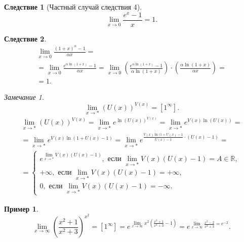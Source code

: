 \documentclass[a4paper,12pt]{article} %
\newtheorem{corollary}{Следствие}[theorem]
\theoremstyle{remark}
\newtheorem{remark}{Замечание}[theorem]
\theoremstyle{definition}
\newtheorem{exmp}{Пример}[section]
\begin{document}
\begin{corollary}[Частный случай следствия 4]
	\[
	\lim_{x \to 0} \frac{e^{x}-1}{x} = 1
	.\] 
\end{corollary}
\begin{corollary}
	\begin{multline}
		\lim_{x \to 0} \frac{(1+x)^{\alpha} - 1}{\alpha x} = \\
		= \lim_{x \to 0} \frac{e^{\alpha \ln(1+x)} - 1}{\alpha x} = \lim_{x \to 0} \left(\frac{e^{\alpha \ln(1+x)} - 1}{\alpha \ln(1+x)}\right) \cdot \left(\frac{\alpha \ln(1+x)}{\alpha x}\right) = \\
		= 1.
	\end{multline}
\end{corollary}
\begin{remark}
	\[
		\lim_{x \to *} (U(x))^{V(x)} = [1^{\infty}]
	.\] 	
	\begin{multline}
		\lim_{x \to *} (U(x))^{V(x)} = \lim_{x \to *}  e^{\ln(U(x))^{V(x)}} = \lim_{x \to *} e^{V(x)\ln(U(x))} = \\
		= \lim_{x \to *} e^{V(x)\ln(1 + U(x) - 1)} = \lim_{x \to *} e^{\frac{V(x)\ln(1 + U(x) - 1}{U(x) - 1}\cdot (U(x) - 1)} = \\
		= \begin{cases}
			e^{\lim_{x \to *} V(x)(U(x) - 1)}, \text{ если } \lim_{x \to *} V(x)(U(x) - 1) = A\in \mathbb{R}, \\
			+\infty, \text{ если } \lim_{x \to *} V(x)(U(x) - 1) = +\infty, \\
			0, \text{ если } \lim_{x \to *} V(x)(U(x)-1) = -\infty.
		\end{cases}
	\end{multline}
\end{remark}
\begin{exmp}
	\[	
		\lim_{x \to \infty} \left(\frac{x^2 + 1}{x^2 + 3}\right)^{x^2} = [1^{\infty}] = e^{\lim_{x \to \infty} x^2 \left(\frac{x^2 + 1}{x^2 + 3} - 1\right)} = e^{\lim_{x \to \infty} \frac{x^2-2}{x^2 + 3} = e^{-2}}
	.\] 
\end{exmp}
\end{document}
